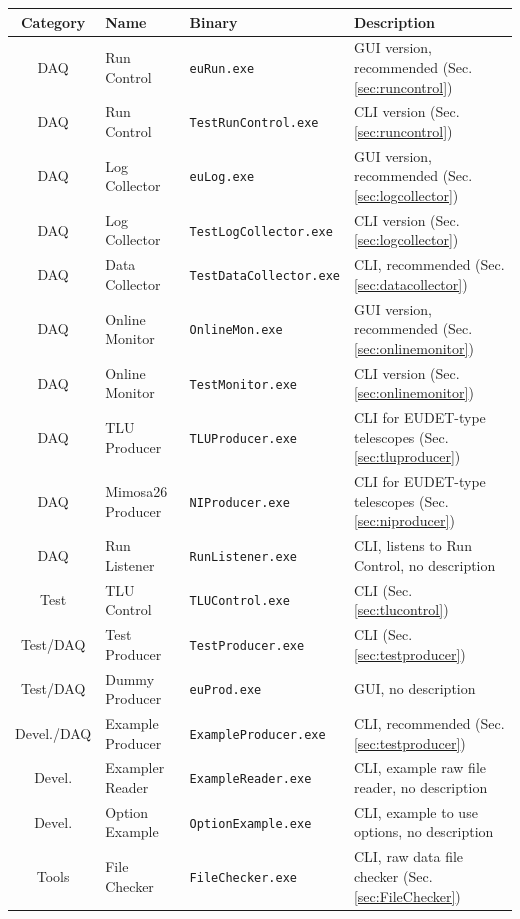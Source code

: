 \begin{table}
\centering
\small
\begin{tabular}{ c | l | l | p{4cm}}
  \textbf{Category} & \textbf{Name} & \textbf{Binary}  & \textbf{Description}\\
  \hline			
  \hline			
  DAQ & Run Control & \texttt{euRun.exe} & GUI version, recommended (Sec. \ref{sec:runcontrol}) \\
  DAQ & Run Control & \texttt{TestRunControl.exe} & CLI version (Sec. \ref{sec:runcontrol}) \\
  DAQ & Log Collector & \texttt{euLog.exe} & GUI version, recommended (Sec. \ref{sec:logcollector}) \\
  DAQ & Log Collector & \texttt{TestLogCollector.exe} & CLI version (Sec. \ref{sec:logcollector}) \\
  DAQ & Data Collector & \texttt{TestDataCollector.exe} & CLI, recommended (Sec. \ref{sec:datacollector}) \\
  DAQ & Online Monitor & \texttt{OnlineMon.exe} & GUI version, recommended (Sec. \ref{sec:onlinemonitor}) \\
  DAQ & Online Monitor & \texttt{TestMonitor.exe} & CLI version (Sec. \ref{sec:onlinemonitor}) \\
  DAQ & TLU Producer & \texttt{TLUProducer.exe} & CLI for EUDET-type telescopes (Sec. \ref{sec:tluproducer}) \\
  DAQ & Mimosa26 Producer & \texttt{NIProducer.exe} & CLI for EUDET-type telescopes (Sec. \ref{sec:niproducer}) \\
  DAQ & Run Listener & \texttt{RunListener.exe} & CLI, listens to Run Control, no description \\
  \hline
  Test & TLU Control & \texttt{TLUControl.exe} & CLI (Sec. \ref{sec:tlucontrol}) \\
  Test/DAQ & Test Producer & \texttt{TestProducer.exe} & CLI (Sec. \ref{sec:testproducer}) \\
  Test/DAQ & Dummy Producer & \texttt{euProd.exe} & GUI, no description \\
  Devel./DAQ & Example Producer & \texttt{ExampleProducer.exe} & CLI, recommended (Sec. \ref{sec:testproducer}) \\
  Devel. & Exampler Reader & \texttt{ExampleReader.exe} & CLI, example raw file reader, no description \\
  Devel. & Option Example & \texttt{OptionExample.exe} & CLI, example to use options, no description \\
  \hline
  Tools & File Checker & \texttt{FileChecker.exe} & CLI, raw data file checker (Sec. \ref{sec:FileChecker}) \\

\end{tabular}
\end{table}

